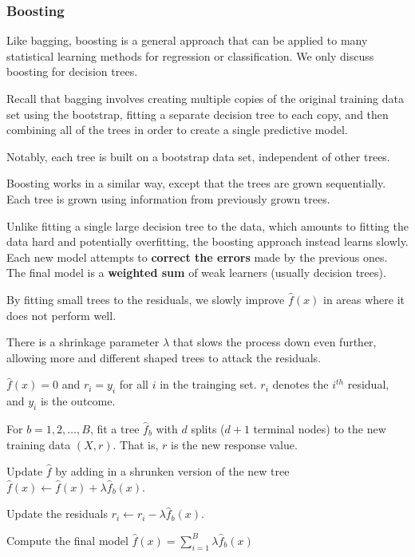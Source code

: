 \subsubsection{Boosting}

\indent

Like bagging, boosting is a general approach that can be applied to many statistical learning methods for regression or classification. We only discuss boosting for decision trees.

Recall that bagging involves creating multiple copies of the original training data set using the bootstrap, fitting a separate decision tree to each copy, and then combining all of the trees in order to create a single predictive model.

Notably, each tree is built on a bootstrap data set, independent of other trees.

Boosting works in a similar way, except that the trees are grown sequentially. Each tree is grown using information from previously grown trees.

Unlike fitting a single large decision tree to the data, which amounts to fitting the data hard and potentially overfitting, the boosting approach instead learns slowly. Each new model attempts to \textbf{correct the errors} made by the previous ones. The final model is a \textbf{weighted sum} of weak learners (usually decision trees).

By fitting small trees to the residuals, we slowly improve $\hat{f}(x)$ in areas where it does not perform well.

There is a shrinkage parameter $\lambda$ that slows the process down even further, allowing more and different shaped trees to attack the residuals.

\step $\hat{f}(x) = 0$ and $r_i = y_i$ for all $i$ in the trainging set. $r_i$ denotes the $i^{th}$ residual, and $y_i$ is the outcome.

\step For $b=1,2,\ldots,B$, fit a tree $\hat{f}_b$ with $d$ splits ($d+1$ terminal nodes) to the new training data $(X,r)$. That is, $r$ is the new response value. 

\step Update $\hat{f}$ by adding in a shrunken version of the new tree $\hat{f}(x) \xleftarrow{}\hat{f}(x) + \lambda \hat{f}_b(x)$. 

\step Update the residuals $r_i \xleftarrow{} r_i - \lambda \hat{f}_b(x)$.

\step Compute the final model $\hat{f}(x) = \sum_{i=1}^B \lambda\hat{f}_b(x)$

\bigskip

